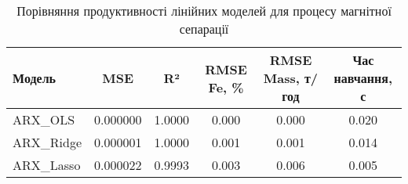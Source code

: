 \begin{table}[h]
\centering
\caption{Порівняння продуктивності лінійних моделей для процесу магнітної сепарації}
\label{tab:linear_models_comparison}
\begin{tabular}{|l|c|c|c|c|c|}
\hline
\textbf{Модель} & \textbf{MSE} & \textbf{R²} & \textbf{RMSE Fe, \%} & \textbf{RMSE Mass, т/год} & \textbf{Час навчання, с} \\
\hline
ARX_OLS & 0.000000 & 1.0000 & 0.000 & 0.000 & 0.020 \\
\hline
ARX_Ridge & 0.000001 & 1.0000 & 0.001 & 0.001 & 0.014 \\
\hline
ARX_Lasso & 0.000022 & 0.9993 & 0.003 & 0.006 & 0.005 \\
\hline
\end{tabular}
\end{table}